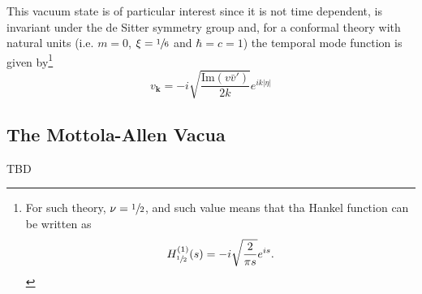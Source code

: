 This vacuum state is of particular interest since it is not time dependent, is invariant under the de Sitter symmetry group and, for a conformal theory with natural units (i.e. $m=0$, $\xi=\sfrac{1}{6}$ and $\hbar=c=1$) the temporal mode function is given by\footnote{For such theory, $\nu=\sfrac{1}{2}$, and such value means that tha Hankel function can be written as $$H^{(1)}_{\sfrac{1}{2}}(s)=-i\sqrt{\frac{2}{\pi s}}e^{is}.$$}
\begin{equation}
	v_\mathbf{k}=-i\sqrt{\frac{\text{Im}\left(v\bar{v}'\right)}{2k}}e^{ik|\eta|}
\end{equation}
\subsection{The Mottola-Allen Vacua}
TBD
